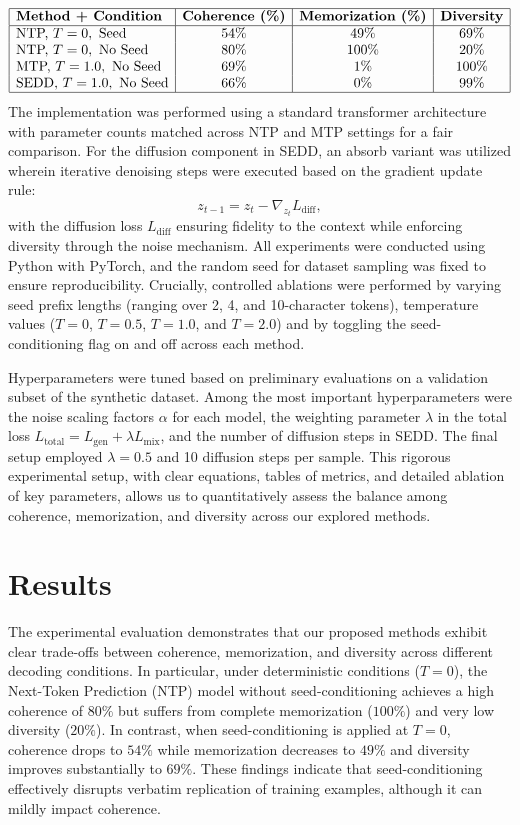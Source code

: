 \documentclass[11pt]{article}
\begin{document}
\[
\begin{array}{|l|c|c|c|}
\hline
\textbf{Method + Condition} & \textbf{Coherence (\%)} & \textbf{Memorization (\%)} & \textbf{Diversity} \\
\hline
\text{NTP, }T=0,\ \text{Seed} & 54\% & 49\% & 69\% \\
\text{NTP, }T=0,\ \text{No Seed} & 80\% & 100\% & 20\% \\
\text{MTP, }T=1.0,\ \text{No Seed} & 69\% & 1\% & 100\% \\
\text{SEDD, }T=1.0,\ \text{No Seed} & 66\% & 0\% & 99\% \\
\hline
\end{array}
\]
%
The implementation was performed using a standard transformer architecture with parameter counts matched across NTP and MTP settings for a fair comparison. For the diffusion component in SEDD, an absorb variant was utilized wherein iterative denoising steps were executed based on the gradient update rule:
\[
z_{t-1} = z_t - \nabla_{z_t} L_{\text{diff}},
\]
with the diffusion loss \( L_{\text{diff}} \) ensuring fidelity to the context while enforcing diversity through the noise mechanism. All experiments were conducted using Python with PyTorch, and the random seed for dataset sampling was fixed to ensure reproducibility. Crucially, controlled ablations were performed by varying seed prefix lengths (ranging over 2, 4, and 10-character tokens), temperature values (\(T=0\), \(T=0.5\), \(T=1.0\), and \(T=2.0\)) and by toggling the seed-conditioning flag on and off across each method.

Hyperparameters were tuned based on preliminary evaluations on a validation subset of the synthetic dataset. Among the most important hyperparameters were the noise scaling factors \(\alpha\) for each model, the weighting parameter \(\lambda\) in the total loss \( L_{\text{total}} = L_{\text{gen}} + \lambda L_{\text{mix}} \), and the number of diffusion steps in SEDD. The final setup employed \(\lambda = 0.5\) and 10 diffusion steps per sample. This rigorous experimental setup, with clear equations, tables of metrics, and detailed ablation of key parameters, allows us to quantitatively assess the balance among coherence, memorization, and diversity across our explored methods.

\section{Results}
The experimental evaluation demonstrates that our proposed methods exhibit clear trade-offs between coherence, memorization, and diversity across different decoding conditions. In particular, under deterministic conditions (\(T=0\)), the Next-Token Prediction (NTP) model without seed-conditioning achieves a high coherence of \(80\%\) but suffers from complete memorization (\(100\%\)) and very low diversity (\(20\%\)). In contrast, when seed-conditioning is applied at \(T=0\), coherence drops to \(54\%\) while memorization decreases to \(49\%\) and diversity improves substantially to \(69\%\). These findings indicate that seed-conditioning effectively disrupts verbatim replication of training examples, although it can mildly impact coherence.
\end{document}
